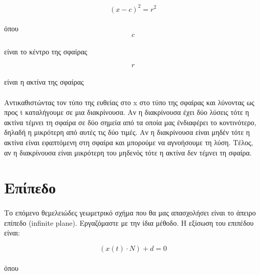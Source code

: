 \begin{sloppypar}
\begin{equation}
(x - c)^2 = r^2
\end{equation}
\paragraph{}
όπου\\

\begin{equation}
c
\end{equation}
\paragraph{}
είναι το κέντρο της σφαίρας

\begin{equation}
r
\end{equation}
\paragraph{}
είναι η ακτίνα της σφαίρας

\paragraph{}
	Αντικαθιστώντας τον τύπο της ευθείας στο x στο τύπο της σφαίρας και λύνοντας ως προς t καταλήγουμε σε μια διακρίνουσα. 
Αν η διακρίνουσα έχει δύο λύσεις τότε η ακτίνα τέμνει τη σφαίρα σε δύο σημεία από τα οποία μας ένδιαφέρει το κοντινότερο, 
δηλαδή η μικρότερη από αυτές τις δύο τιμές. Αν η διακρίνουσα είναι μηδέν τότε η ακτίνα είναι εφαπτόμενη στη σφαίρα και 
μπορούμε να αγνοήσουμε τη λύση. Τέλος, αν η διακρίνουσα είναι μικρότερη του μηδενός τότε η ακτίνα δεν τέμνει τη σφαίρα.


\section{Επίπεδο}
\paragraph{}
	Το επόμενο θεμελειώδες γεωμετρικό σχήμα που θα μας απασχολήσει είναι το άπειρο επίπεδο (infinite plane). Εργαζόμαστε
με την ίδια μέθοδο. Η εξίσωση του επιπέδου είναι:

\begin{equation}
(x(t) \cdot N) + d = 0
\end{equation}

\paragraph{}
όπου\\


\end{sloppypar}
